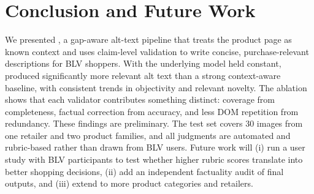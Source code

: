 \section{Conclusion and Future Work}
We presented \sys, a gap-aware alt-text pipeline that treats the product page as known context and uses claim-level validation to write concise, purchase-relevant descriptions for BLV shoppers. With the underlying model held constant, \sys produced significantly more relevant alt text than a strong context-aware baseline, with consistent trends in objectivity and relevant novelty. The ablation shows that each validator contributes something distinct: coverage from completeness, factual correction from accuracy, and less DOM repetition from redundancy. These findings are preliminary. The test set covers 30 images from one retailer and two product families, and all judgments are automated and rubric-based rather than drawn from BLV users. Future work will (i) run a user study with BLV participants to test whether higher rubric scores translate into better shopping decisions, (ii) add an independent factuality audit of final outputs, and (iii) extend \sys to more product categories and retailers.
